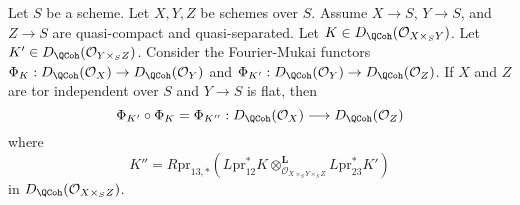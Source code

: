 \begin{lemma}
\label{lemma-compose-fourier-mukai}
Let $S$ be a scheme. Let $X, Y, Z$ be schemes over $S$. Assume
$X \to S$, $Y \to S$, and $Z \to S$ are quasi-compact and quasi-separated.
Let $K \in D_\QCoh(\mathcal{O}_{X \times_S Y})$.
Let $K' \in D_\QCoh(\mathcal{O}_{Y \times_S Z})$.
Consider the Fourier-Mukai functors
$\Phi_K : D_\QCoh(\mathcal{O}_X) \to D_\QCoh(\mathcal{O}_Y)$
and $\Phi_{K'} : D_\QCoh(\mathcal{O}_Y) \to D_\QCoh(\mathcal{O}_Z)$.
If $X$ and $Z$ are tor independent over $S$ and $Y \to S$ is flat,
then
$$
\Phi_{K'} \circ \Phi_K = \Phi_{K''} :
D_\QCoh(\mathcal{O}_X)
\longrightarrow
D_\QCoh(\mathcal{O}_Z)
$$
where
$$
K'' = R\text{pr}_{13, *}(
L\text{pr}_{12}^*K
\otimes_{\mathcal{O}_{X \times_S Y \times_S Z}}^\mathbf{L}
L\text{pr}_{23}^*K')
$$
in $D_\QCoh(\mathcal{O}_{X \times_S Z})$.
\end{lemma}

